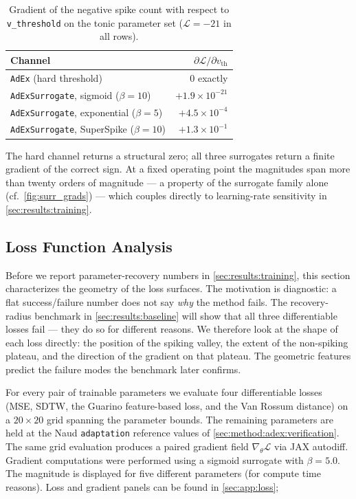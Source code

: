 \begin{table}[!hb]
  \centering
  \caption{Gradient of the negative spike count with respect to \texttt{v\_threshold} on the tonic parameter set ($\mathcal{L} = -21$ in all rows).}\label{tab:surrogate-gradient}
  \small
  \begin{tabular}{lr}
    \toprule
    Channel & $\partial\mathcal{L}/\partial v_{\text{th}}$ \\
    \midrule
    \texttt{AdEx} (hard threshold)                       & $0$ exactly \\
    \texttt{AdExSurrogate}, sigmoid ($\beta = 10$)       & $+1.9 \times 10^{-21}$ \\
    \texttt{AdExSurrogate}, exponential ($\beta = 5$)    & $+4.5 \times 10^{-4}$ \\
    \texttt{AdExSurrogate}, SuperSpike ($\beta = 10$)    & $+1.3 \times 10^{-1}$ \\
    \bottomrule
  \end{tabular}
\end{table}

The hard channel returns a structural zero; all three surrogates return a finite gradient of the correct sign.
At a fixed operating point the magnitudes span more than twenty orders of magnitude --- a property of the surrogate family alone (cf.\ \cref{fig:surr_grads}) --- which couples directly to learning-rate sensitivity in \cref{sec:results:training}.

\subsection{Loss Function Analysis}\label{sec:results:landscape}

Before we report parameter-recovery numbers in \cref{sec:results:training}, this section characterizes the geometry of the loss surfaces.
The motivation is diagnostic: a flat success/failure number does not say \emph{why} the method fails.
The recovery-radius benchmark in \cref{sec:results:baseline} will show that all three differentiable losses fail --- they do so for different reasons.
We therefore look at the shape of each loss directly: the position of the spiking valley, the extent of the non-spiking plateau, and the direction of the gradient on that plateau.
The geometric features predict the failure modes the benchmark later confirms.

For every pair of trainable parameters we evaluate four differentiable losses (\gls{MSE}, \gls{SDTW}, the Guarino feature-based loss, and the Van Rossum distance) on a $20\times 20$ grid spanning the parameter bounds.
The remaining parameters are held at the Naud \texttt{adaptation} reference values of \cref{sec:method:adex:verification}.
The same grid evaluation produces a paired gradient field $\nabla_{\theta}\mathcal{L}$ via JAX autodiff.
Gradient computations were performed using a sigmoid surrogate with $\beta = 5.0$.
The magnitude is displayed for five different parameters (for compute time reasons).
Loss and gradient panels can be found in \cref{sec:app:loss};

